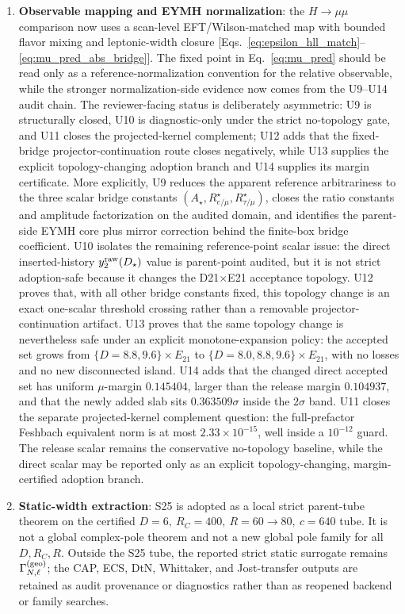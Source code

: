 \documentclass[aps,prd,onecolumn,notitlepage,nofootinbib,superscriptaddress,11pt,floatfix]{revtex4-2}
\begin{document}
\begin{enumerate}
    \item \textbf{Observable mapping and EYMH normalization}: the $H\to\mu\mu$ comparison now uses a scan-level EFT/Wilson-matched map with bounded flavor mixing and leptonic-width closure [Eqs.~\eqref{eq:epsilon_hll_match}--\eqref{eq:mu_pred_abs_bridge}]. The fixed point in Eq.~\eqref{eq:mu_pred} should be read only as a reference-normalization convention for the relative observable, while the stronger normalization-side evidence now comes from the U9--U14 audit chain. The reviewer-facing status is deliberately asymmetric: U9 is structurally closed, U10 is diagnostic-only under the strict no-topology gate, and U11 closes the projected-kernel complement; U12 adds that the fixed-bridge projector-continuation route closes negatively, while U13 supplies the explicit topology-changing adoption branch and U14 supplies its margin certificate. More explicitly, U9 reduces the apparent reference arbitrariness to the three scalar bridge constants $(A_\star,R_{e/\mu}^\star,R_{\tau/\mu}^\star)$, closes the ratio constants and amplitude factorization on the audited domain, and identifies the parent-side EYMH core plus mirror correction behind the finite-box bridge coefficient. U10 isolates the remaining reference-point scalar issue: the direct inserted-history \(y_2^{\rm raw}(D_\star)\) value is parent-point audited, but it is not strict adoption-safe because it changes the D21\(\times\)E21 acceptance topology. U12 proves that, with all other bridge constants fixed, this topology change is an exact one-scalar threshold crossing rather than a removable projector-continuation artifact. U13 proves that the same topology change is nevertheless safe under an explicit monotone-expansion policy: the accepted set grows from \(\{D=8.8,9.6\}\times E_{21}\) to \(\{D=8.0,8.8,9.6\}\times E_{21}\), with no losses and no new disconnected island. U14 adds that the changed direct accepted set has uniform \(\mu\)-margin \(0.145404\), larger than the release margin \(0.104937\), and that the newly added slab sits \(0.363509\sigma\) inside the \(2\sigma\) band. U11 closes the separate projected-kernel complement question: the full-prefactor Feshbach equivalent norm is at most \(2.33\times10^{-15}\), well inside a \(10^{-12}\) guard. The release scalar remains the conservative no-topology baseline, while the direct scalar may be reported only as an explicit topology-changing, margin-certified adoption branch.
    \item \textbf{Static-width extraction}: S25 is adopted as a local strict parent-tube theorem on the certified \(D=6,\ R_C=400,\ R=60\to80,\ c=640\) tube. It is not a global complex-pole theorem and not a new global pole family for all \(D,R_C,R\). Outside the S25 tube, the reported strict static surrogate remains \(\Gamma_{N,\ell}^{\rm(geo)}\); the CAP, ECS, DtN, Whittaker, and Jost-transfer outputs are retained as audit provenance or diagnostics rather than as reopened backend or family searches.

\end{enumerate}
\end{document}
